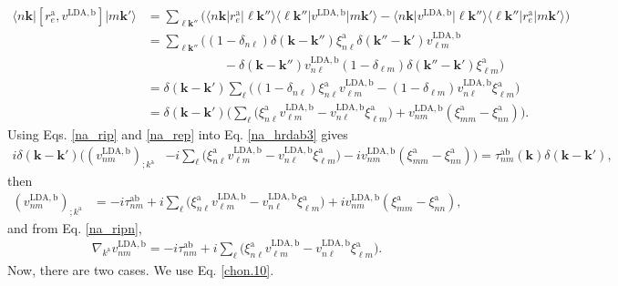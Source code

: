 \begin{align}\label{na_rep}
\langle n\mathbf{k}\vert[r^{\mathrm{a}}_e,v^{\mathrm{LDA},\mathrm{b}}]\vert m\mathbf{k}'\rangle&=
\sum_{\ell\mathbf{k}''}
\bigg(
\langle n\mathbf{k}\vert r^{\mathrm{a}}_e\vert\ell\mathbf{k}''\rangle\langle \ell\mathbf{k}''\vert v^{\mathrm{LDA},\mathrm{b}}\vert m\mathbf{k}'\rangle
-
\langle n\mathbf{k}\vert v^{\mathrm{LDA},\mathrm{b}}\vert\ell\mathbf{k}''\rangle\langle \ell\mathbf{k}''\vert r^{\mathrm{a}}_e\vert m\mathbf{k}'\rangle
\bigg)
\nonumber \\
&=
\sum_{\ell\mathbf{k}''}
\bigg(
(1-\delta_{n\ell})\delta(\mathbf{k}-\mathbf{k}'')\xi^{\mathrm{a}}_{n\ell}
\delta(\mathbf{k}''-\mathbf{k}')v^{\mathrm{LDA},\mathrm{b}}_{\ell m}\nonumber\\
&\qquad\qquad\qquad-
\delta(\mathbf{k}-\mathbf{k}'')v^{\mathrm{LDA},\mathrm{b}}_{n\ell}
(1-\delta_{\ell m})\delta(\mathbf{k}''-\mathbf{k}')\xi^{\mathrm{a}}_{\ell m}
\bigg)
\nonumber \\
&=
\delta(\mathbf{k}-\mathbf{k}')
\sum_{\ell}
\bigg(
(1-\delta_{n\ell})
\xi^{\mathrm{a}}_{n\ell}
v^{\mathrm{LDA},\mathrm{b}}_{\ell m}
-
(1-\delta_{\ell m})
v^{\mathrm{LDA},\mathrm{b}}_{n\ell}
\xi^{\mathrm{a}}_{\ell m}
\bigg)
\nonumber \\
&=
\delta(\mathbf{k}-\mathbf{k}')
\bigg(
\sum_{\ell}
\bigg(
\xi^{\mathrm{a}}_{n\ell}
v^{\mathrm{LDA},\mathrm{b}}_{\ell m}
-
v^{\mathrm{LDA},\mathrm{b}}_{n\ell}
\xi^{\mathrm{a}}_{\ell m}
\bigg)
+
v^{\mathrm{LDA},\mathrm{b}}_{nm}(\xi^{\mathrm{a}}_{mm}
-
\xi^{\mathrm{a}}_{nn}
)
\bigg)
.
\end{align}
Using Eqs. \eqref{na_rip} and  \eqref{na_rep}
into Eq. \eqref{na_hrdab3} gives
\begin{align}\label{na_rapb}
i\delta(\mathbf{k}-\mathbf{k}')
\bigg(
(v^{\mathrm{LDA},\mathrm{b}}_{nm})_{;k^{\mathrm{a}}}
&
-i
\sum_{\ell}
\bigg(
\xi^{\mathrm{a}}_{n\ell}
v^{\mathrm{LDA},\mathrm{b}}_{\ell m}
-
v^{\mathrm{LDA},\mathrm{b}}_{n\ell}
\xi^{\mathrm{a}}_{\ell m}
\bigg)
-i
v^{\mathrm{LDA},\mathrm{b}}_{nm}(\xi^{\mathrm{a}}_{mm}
-
\xi^{\mathrm{a}}_{nn}
)
\bigg)
=
\tau^{\mathrm{a}\mathrm{b}}_{nm}(\mathbf{k})\delta(\mathbf{k}-\mathbf{k}')
,
\end{align}
then
\begin{align}\label{na_rapb2}
(v^{\mathrm{LDA},\mathrm{b}}_{nm})_{;k^{\mathrm{a}}}&=
-i
\tau^{\mathrm{a}\mathrm{b}}_{nm}
+i
\sum_{\ell}
\bigg(
\xi^{\mathrm{a}}_{n\ell}
v^{\mathrm{LDA},\mathrm{b}}_{\ell m}
-
v^{\mathrm{LDA},\mathrm{b}}_{n\ell}
\xi^{\mathrm{a}}_{\ell m}
\bigg)
+i
v^{\mathrm{LDA},\mathrm{b}}_{nm}(\xi^{\mathrm{a}}_{mm}
-
\xi^{\mathrm{a}}_{nn}
)
,
\end{align}
and from Eq. \eqref{na_ripn},
\begin{align}\label{ncogno}
\nabla_{k^{\mathrm{a}}}v^{\mathrm{LDA},\mathrm{b}}_{nm}=
-i\tau^{\mathrm{a}\mathrm{b}}_{nm}
+i
\sum_{\ell}
\bigg(
\xi^{\mathrm{a}}_{n\ell}
v^{\mathrm{LDA},\mathrm{b}}_{\ell m}
-
v^{\mathrm{LDA},\mathrm{b}}_{n\ell}
\xi^{\mathrm{a}}_{\ell m}
\bigg)
.
\end{align}
Now, there are two cases. We use Eq. \eqref{chon.10}.


